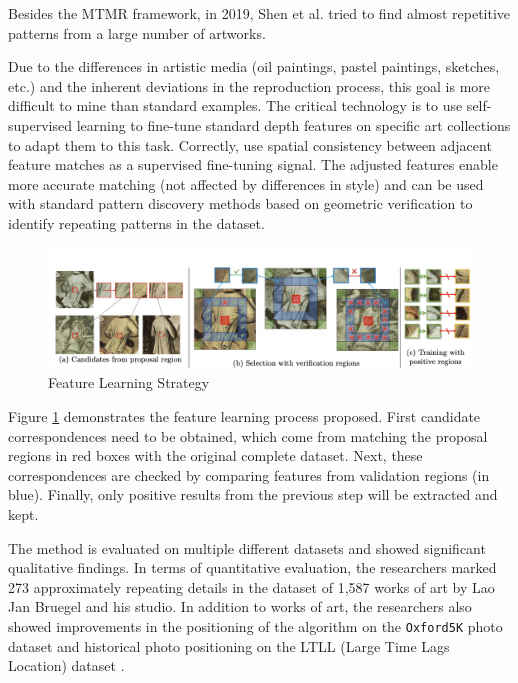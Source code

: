 Besides the MTMR framework, in 2019, Shen et al. \cite{shen2019discovering} tried to find almost repetitive patterns from a large number of artworks. 

Due to the differences in artistic media (oil paintings, pastel paintings, sketches, etc.) and the inherent deviations in the reproduction process, this goal is more difficult to mine than standard examples. The critical technology is to use self-supervised learning to fine-tune standard depth features on specific art collections to adapt them to this task. Correctly, use spatial consistency between adjacent feature matches as a supervised fine-tuning signal. The adjusted features enable more accurate matching (not affected by differences in style) and can be used with standard pattern discovery methods based on geometric verification to identify repeating patterns in the dataset.

\begin{figure}[h!]
\centering
\includegraphics[width=\textwidth]{featurelearningartwork.pdf}
\caption{Feature Learning Strategy \cite{shen2019discovering}}
\label{fig:featurelearning}
\end{figure}

Figure \ref{fig:featurelearning} demonstrates the feature learning process proposed. First candidate correspondences need to be obtained, which come from matching the proposal regions in red boxes with the original complete dataset. Next, these correspondences are checked by comparing features from validation regions (in blue). Finally, only positive results from the previous step will be extracted and kept. 

The method is evaluated on multiple different datasets and showed significant qualitative findings. In terms of quantitative evaluation, the researchers marked 273 approximately repeating details in the dataset of 1,587 works of art by Lao Jan Bruegel and his studio. In addition to works of art, the researchers also showed improvements in the positioning of the algorithm on the \verb|Oxford5K| photo dataset \cite{Philbin07} and historical photo positioning on the LTLL (Large Time Lags Location) dataset \cite{Fernando2015CVIU}.

